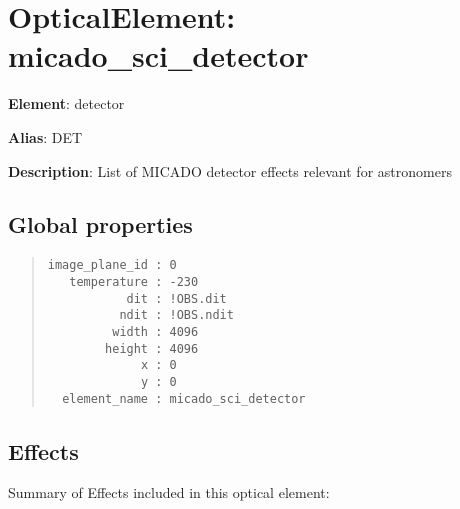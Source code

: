 

\section{OpticalElement: \textquotedbl{}micado\_sci\_detector\textquotedbl{}%
  \label{opticalelement-micado-sci-detector}%
}

\textbf{Element}: detector

\textbf{Alias}: DET

\textbf{Description}: List of MICADO detector effects relevant for astronomers


\subsection{Global properties%
  \label{global-properties}%
}

\begin{quote}
\begin{alltt}
\begin{lstlisting}[frame=single]
image_plane_id : 0
   temperature : -230
           dit : !OBS.dit
          ndit : !OBS.ndit
         width : 4096
        height : 4096
             x : 0
             y : 0
  element_name : micado_sci_detector
\end{lstlisting}
\end{alltt}
\end{quote}


\subsection{Effects%
  \label{effects}%
}

Summary of Effects included in this optical element:

